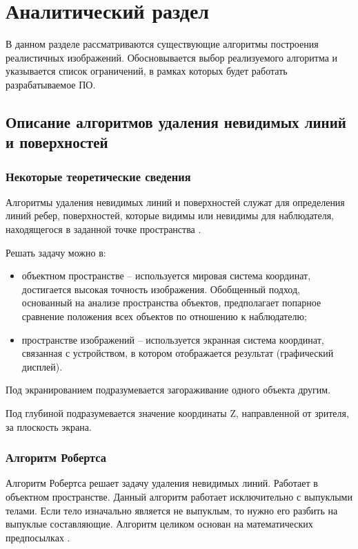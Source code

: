 \chapter{Аналитический раздел}

    В данном разделе рассматриваются существующие алгоритмы построения реалистичных изображений. Обосновывается выбор реализуемого алгоритма и указывается список ограничений, в рамках которых будет работать разрабатываемое ПО.
    
    \section{Описание алгоритмов удаления невидимых линий и поверхностей}

        \subsection {Некоторые теоретические сведения}

            Алгоритмы удаления невидимых линий и поверхностей служат для определения линий ребер, поверхностей, которые видимы или невидимы для наблюдателя, находящегося в заданной точке пространства \cite{rogers}.
            
            Решать задачу можно в:
            \begin{itemize}
            	\item объектном пространстве -- используется мировая система координат, достигается высокая точность изображения. Обобщенный подход, основанный на анализе пространства объектов, предполагает попарное сравнение положения всех объектов по отношению к наблюдателю;
            	\item пространстве изображений -- используется экранная система координат, связанная с устройством, в котором отображается результат (графический дисплей).
            \end{itemize}
            
            Под экранированием подразумевается загораживание одного объекта другим.
            
            Под глубиной подразумевается значение координаты Z, направленной от зрителя, за плоскость экрана.
        
        \subsection{Алгоритм Робертса}
        
            Алгоритм Робертса решает задачу удаления невидимых линий. Работает в объектном пространстве. Данный алгоритм работает исключительно с выпуклыми телами. Если тело изначально является не выпуклым, то нужно его разбить на выпуклые составляющие. Алгоритм целиком основан на математических предпосылках \cite{rogers}.

